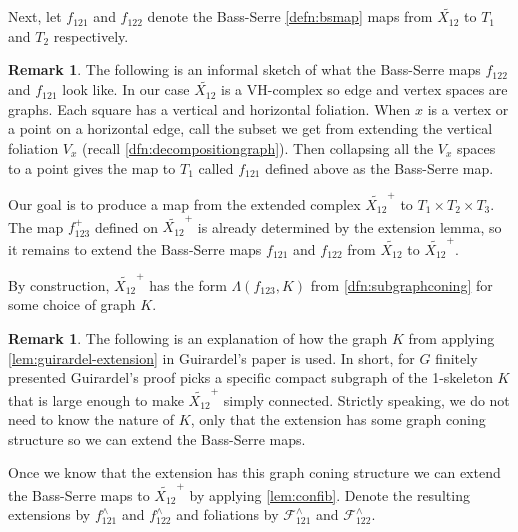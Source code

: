 \documentclass[12pt,parskip=full]{report}
\theoremstyle{plain}
\theoremstyle{definition}
\newtheorem{rmk}[thm]{Remark}
\begin{document}
        Next, let  \(f_{121}\) and  \(f_{122}\)  denote the Bass-Serre \ref{defn:bsmap} maps from \(\widetilde {X_{12}}\) to \(T_{1}\) and \(T_{2}\) respectively.
        
                \begin{rmk}
            
        The following is an informal sketch of what the Bass-Serre maps \(f_{122}\) and \(f_{121}\) look like. In our case \(\widetilde {X_{12}}\) is a VH-complex so edge and vertex spaces are graphs. Each square has a vertical and horizontal foliation. When $x$ is a vertex or a point on a horizontal edge, call the subset we get from extending the vertical foliation $V_x$ (recall \ref{dfn:decompositiongraph}). Then collapsing all the $V_x$ spaces to a point gives the map to $T_1$ called \(f_{121}\) defined above as the Bass-Serre map. 
        \end{rmk}
        
        Our goal is to produce a map from the extended complex \(\widetilde {X_{12}}^+\) to \(T_1\times T_2\times T_3\). The map   \(f_{123}^+\) defined on \(\widetilde {X_{12}}^+\) is already determined by the extension lemma, so it remains to extend the Bass-Serre maps \(f_{121}\) and \(f_{122}\) from \(\widetilde {X_{12}}\) to \(\widetilde {X_{12}}^+\). 
        
        By construction, \(\widetilde {X_{12}}^+\) has the form \(\Lambda(f_{123}, K)\) from \ref{dfn:subgraphconing} for some choice of graph \(K\). 
        
                
        \begin{rmk}
            The following is an explanation of how the graph \(K\) from applying \ref{lem:guirardel-extension} in Guirardel's paper is used. In short, for \(G\) finitely presented Guirardel's proof picks a specific compact subgraph of the 1-skeleton \(K\) that is large enough to make \(\widetilde {X_{12}}^+\) simply connected. Strictly speaking, we do not need to know the nature of \(K\), only that the extension has some graph coning structure so we can extend the Bass-Serre maps.
        \end{rmk}
        
        
        Once we know that the extension has this graph coning structure we can extend the Bass-Serre maps to \(\widetilde {X_{12}}^+\) by applying \ref{lem:confib}. Denote the resulting extensions by \(f_{121}^{\wedge}\) and \(f_{122}^{\wedge}\) and foliations by  \(\mathscr{F}^{\wedge}_{121}\) and \(\mathscr{F}^{\wedge}_{122}\). 
        
\end{document}
